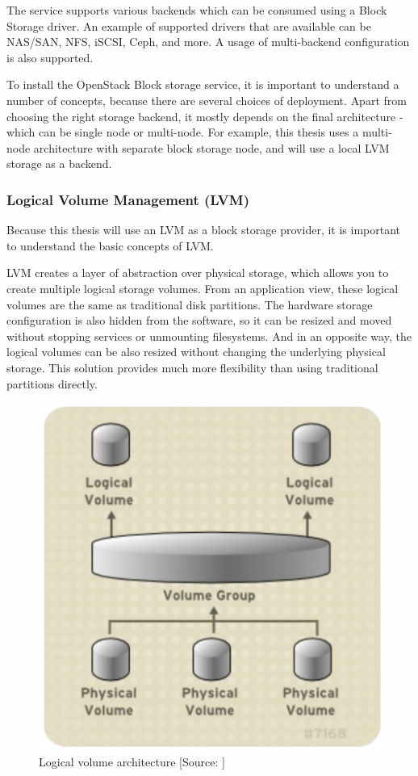 The service supports various backends which can be consumed using a Block Storage driver. An example of supported drivers that are available can be NAS/SAN, NFS, iSCSI, Ceph, and more. A usage of multi-backend configuration is also supported. \cite{InstallGuide}

To install the OpenStack Block storage service, it is important to understand a number of concepts, because there are several choices of deployment. \cite{OperationsGuide} Apart from choosing the right storage backend, it mostly depends on the final architecture - which can be single node or multi-node. For example, this thesis uses a multi-node architecture with separate block storage node, and will use a local LVM storage as a backend.

\subsubsection*{Logical Volume Management (LVM)}
Because this thesis will use an LVM as a block storage provider, it is important to understand the basic concepts of LVM.

LVM creates a layer of abstraction over physical storage, which allows you to create multiple logical storage volumes. From an application view, these logical volumes are the same as traditional disk partitions. The hardware storage configuration is also hidden from the software, so it can be resized and moved without stopping services or unmounting filesystems. And in an opposite way, the logical volumes can be also resized without changing the underlying physical storage. This solution provides much more flexibility than using traditional partitions directly. \cite{LVMPdf}

\begin{figure}[!h]
  \includegraphics[width=\textwidth]{fig/lvm_architecture.png}
  \caption{Logical volume architecture [Source: \cite{lvmArch}]}
  \label{fig:lvm_architecture}
\end{figure}

